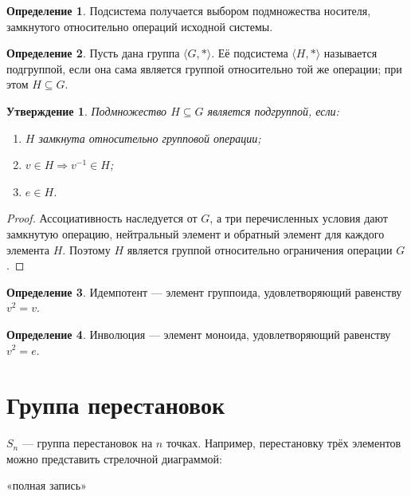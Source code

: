 \documentclass[12pt,a4paper,oneside,openany]{book}
\theoremstyle{definition}
\newtheorem{definition}{Определение}[chapter]
\theoremstyle{plain}
\newtheorem{proposition}{Утверждение}[chapter]
\theoremstyle{remark}
\begin{document}
\begin{definition}
Подсистема получается выбором подмножества носителя, замкнутого
относительно операций исходной системы.
\end{definition}


\begin{definition}
Пусть дана группа \(\langle G,*\rangle\). Её подсистема
\(\langle H,*\rangle\) называется подгруппой, если она сама является
группой относительно той же операции; при этом \(H\subseteq G\).
\end{definition}

\begin{proposition}
Подмножество \(H\subseteq G\) является подгруппой, если:
\begin{enumerate}[label=\arabic*)]
  \item \(H\) замкнута относительно групповой операции;
  \item \(v\in H\Rightarrow v^{-1}\in H\);
  \item \(e\in H\).
\end{enumerate}
\end{proposition}

\begin{proof}
Ассоциативность наследуется от $G$, а три перечисленных условия дают
замкнутую операцию, нейтральный элемент и обратный элемент для каждого
элемента $H$. Поэтому $H$ является группой относительно ограничения
операции $G$.
\end{proof}

\begin{definition}
Идемпотент --- элемент группоида, удовлетворяющий равенству \(v^2=v\).
\end{definition}

\begin{definition}
Инволюция --- элемент моноида, удовлетворяющий равенству \(v^2=e\).
\end{definition}

\section{Группа перестановок}

\(S_n\) --- группа перестановок на \(n\) точках. Например, перестановку
трёх элементов можно представить стрелочной диаграммой:

\begin{center}
\qquad «полная запись»
\end{center}
\end{document}

